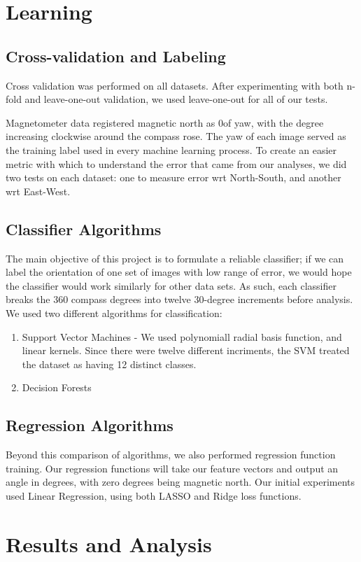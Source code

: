 \documentclass{article}
\begin{document}
\section{Learning}

\subsection{Cross-validation and Labeling}
Cross validation was performed on all datasets. After experimenting with both n-fold and leave-one-out validation, we used leave-one-out for all of our tests. 

Magnetometer data registered magnetic north as 0\degrees of yaw, with the degree increasing clockwise around the compass rose. The yaw of each image served as the training label used in every machine learning process. To create an easier metric with which to understand the error that came from our analyses, we did two tests on each dataset: one to measure error wrt North-South, and another wrt East-West. 

\subsection{Classifier Algorithms}
The main objective of this project is to formulate a reliable classifier; if we can label the orientation of one set of images with low range of error, we would hope the classifier would work similarly for other data sets. As such, each classifier breaks the 360 compass degrees into twelve 30-degree increments before analysis. We used two different algorithms for classification: 
\begin{enumerate}[1.]
\item Support Vector Machines - We used polynomiall radial basis function, and linear kernels. Since there were twelve different incriments, the SVM treated the dataset as having 12 distinct classes. 
\item Decision Forests
\end{enumerate}

\subsection{Regression Algorithms}
Beyond this comparison of algorithms, we also performed regression function training. Our regression functions will take our feature vectors and output an angle in degrees, with zero degrees being magnetic north. Our initial experiments used Linear Regression, using both LASSO and Ridge loss functions. 


\section{Results and Analysis}
\end{document}
